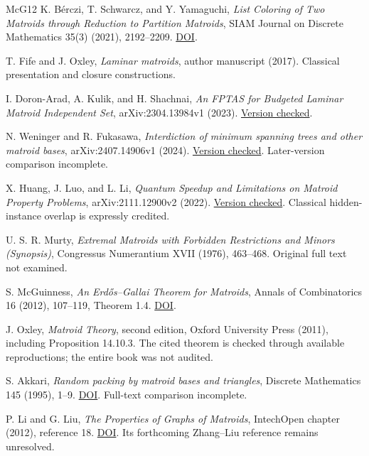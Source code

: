 \documentclass[11pt]{article}
\begin{document}
\begin{thebibliography}{McG12}
\hypertarget{refBSY21}{}K. B\'{e}rczi, T. Schwarcz, and Y. Yamaguchi, \emph{List Coloring of Two Matroids through Reduction to Partition Matroids}, SIAM Journal on Discrete Mathematics 35(3) (2021), 2192--2209. \href{https://doi.org/10.1137/20M1385615}{DOI}.

\hypertarget{refFO17}{}T. Fife and J. Oxley, \emph{Laminar matroids}, author manuscript (2017). Classical presentation and closure constructions.

\hypertarget{refDA23}{}I. Doron-Arad, A. Kulik, and H. Shachnai, \emph{An FPTAS for Budgeted Laminar Matroid Independent Set}, arXiv:2304.13984v1 (2023). \href{https://arxiv.org/abs/2304.13984v1}{Version checked}.

\hypertarget{refWF24}{}N. Weninger and R. Fukasawa, \emph{Interdiction of minimum spanning trees and other matroid bases}, arXiv:2407.14906v1 (2024). \href{https://arxiv.org/abs/2407.14906v1}{Version checked}. Later-version comparison incomplete.

\hypertarget{refHLL22}{}X. Huang, J. Luo, and L. Li, \emph{Quantum Speedup and Limitations on Matroid Property Problems}, arXiv:2111.12900v2 (2022). \href{https://arxiv.org/abs/2111.12900v2}{Version checked}. Classical hidden-instance overlap is expressly credited.

\hypertarget{refMur76}{}U. S. R. Murty, \emph{Extremal Matroids with Forbidden Restrictions and Minors (Synopsis)}, Congressus Numerantium XVII (1976), 463--468. Original full text not examined.

\hypertarget{refMcG12}{}S. McGuinness, \emph{An Erd\H{o}s--Gallai Theorem for Matroids}, Annals of Combinatorics 16 (2012), 107--119, Theorem 1.4. \href{https://doi.org/10.1007/s00026-011-0123-4}{DOI}.

\hypertarget{refOx11}{}J. Oxley, \emph{Matroid Theory}, second edition, Oxford University Press (2011), including Proposition 14.10.3. The cited theorem is checked through available reproductions; the entire book was not audited.

\hypertarget{refAkk95}{}S. Akkari, \emph{Random packing by matroid bases and triangles}, Discrete Mathematics 145 (1995), 1--9. \href{https://doi.org/10.1016/0012-365X(94)00050-S}{DOI}. Full-text comparison incomplete.

\hypertarget{refLL12}{}P. Li and G. Liu, \emph{The Properties of Graphs of Matroids}, IntechOpen chapter (2012), reference 18. \href{https://doi.org/10.5772/35778}{DOI}. Its forthcoming Zhang--Liu reference remains unresolved.

\end{thebibliography}
\end{document}
